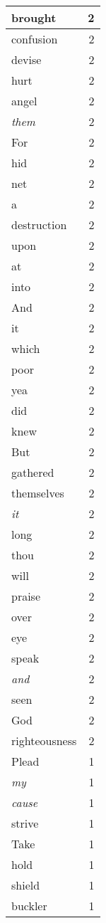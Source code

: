 \begin{center}
\begin{longtable}{l|r}
brought & 2 \\ \hline
confusion & 2 \\ \hline
devise & 2 \\ \hline
hurt & 2 \\ \hline
angel & 2 \\ \hline
\emph{them} & 2 \\ \hline
For & 2 \\ \hline
hid & 2 \\ \hline
net & 2 \\ \hline
a & 2 \\ \hline
destruction & 2 \\ \hline
upon & 2 \\ \hline
at & 2 \\ \hline
into & 2 \\ \hline
And & 2 \\ \hline
it & 2 \\ \hline
which & 2 \\ \hline
poor & 2 \\ \hline
yea & 2 \\ \hline
did & 2 \\ \hline
knew & 2 \\ \hline
But & 2 \\ \hline
gathered & 2 \\ \hline
themselves & 2 \\ \hline
\emph{it} & 2 \\ \hline
long & 2 \\ \hline
thou & 2 \\ \hline
will & 2 \\ \hline
praise & 2 \\ \hline
over & 2 \\ \hline
eye & 2 \\ \hline
speak & 2 \\ \hline
\emph{and} & 2 \\ \hline
seen & 2 \\ \hline
God & 2 \\ \hline
righteousness & 2 \\ \hline
Plead & 1 \\ \hline
\emph{my} & 1 \\ \hline
\emph{cause} & 1 \\ \hline
strive & 1 \\ \hline
Take & 1 \\ \hline
hold & 1 \\ \hline
shield & 1 \\ \hline
buckler & 1 \\ \hline

\end{longtable}
\end{center}
